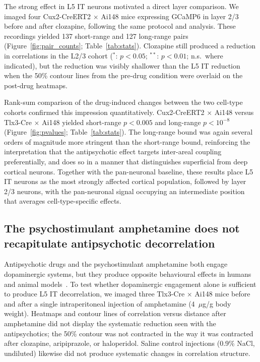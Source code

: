 \documentclass[11pt]{article}
\begin{document}
The strong effect in L5 IT neurons motivated a direct layer comparison. We imaged four Cux2-CreERT2 $\times$ Ai148 mice expressing GCaMP6 in layer 2/3 before and after clozapine, following the same protocol and analysis. These recordings yielded 137 short-range and 127 long-range pairs (Figure~\ref{fig:pair_counts}; Table~\ref{tab:stats}). Clozapine still produced a reduction in correlations in the L2/3 cohort ($^{*}$: $p<0.05$; $^{**}$: $p<0.01$; n.s.\ where indicated), but the reduction was visibly shallower than the L5 IT reduction when the 50\% contour lines from the pre-drug condition were overlaid on the post-drug heatmaps.

Rank-sum comparison of the drug-induced changes between the two cell-type cohorts confirmed this impression quantitatively. Cux2-CreERT2 $\times$ Ai148 versus Tlx3-Cre $\times$ Ai148 yielded short-range $p<0.005$ and long-range $p<10^{-8}$ (Figure~\ref{fig:pvalues}; Table~\ref{tab:stats}). The long-range bound was again several orders of magnitude more stringent than the short-range bound, reinforcing the interpretation that the antipsychotic effect targets inter-areal coupling preferentially, and does so in a manner that distinguishes superficial from deep cortical neurons. Together with the pan-neuronal baseline, these results place L5 IT neurons as the most strongly affected cortical population, followed by layer 2/3 neurons, with the pan-neuronal signal occupying an intermediate position that averages cell-type-specific effects.

\subsection{The psychostimulant amphetamine does not recapitulate antipsychotic decorrelation}

Antipsychotic drugs and the psychostimulant amphetamine both engage dopaminergic systems, but they produce opposite behavioural effects in humans and animal models~\citep{howes2009dopamine}. To test whether dopaminergic engagement alone is sufficient to produce L5 IT decorrelation, we imaged three Tlx3-Cre $\times$ Ai148 mice before and after a single intraperitoneal injection of amphetamine (4~$\mu$g/g body weight). Heatmaps and contour lines of correlation versus distance after amphetamine did not display the systematic reduction seen with the antipsychotics; the 50\% contour was not contracted in the way it was contracted after clozapine, aripiprazole, or haloperidol. Saline control injections (0.9\% NaCl, undiluted) likewise did not produce systematic changes in correlation structure.
\end{document}
